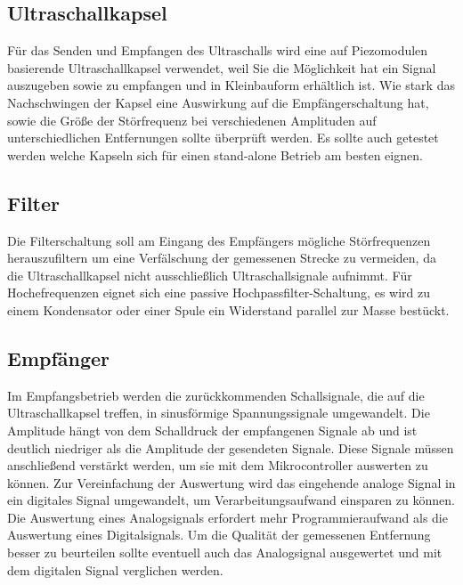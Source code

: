\subsection{Ultraschallkapsel}
Für das Senden und Empfangen des Ultraschalls wird eine auf Piezomodulen basierende Ultraschallkapsel verwendet, weil Sie die Möglichkeit hat ein Signal auszugeben sowie zu empfangen und in Kleinbauform erhältlich ist. Wie stark das Nachschwingen der Kapsel eine Auswirkung auf die Empfängerschaltung hat, sowie die Größe der Störfrequenz bei verschiedenen Amplituden auf unterschiedlichen Entfernungen sollte überprüft werden. Es sollte auch getestet werden welche Kapseln sich für einen stand-alone Betrieb am besten eignen.

\subsection{Filter}
Die Filterschaltung soll am Eingang des Empfängers mögliche Störfrequenzen herauszufiltern um eine Verfälschung der gemessenen Strecke zu vermeiden, da die Ultraschallkapsel nicht ausschließlich Ultraschallsignale aufnimmt. Für Hochefrequenzen eignet sich eine passive Hochpassfilter-Schaltung, es wird zu einem Kondensator oder einer Spule ein Widerstand parallel zur Masse bestückt. 

\subsection{Empfänger}
Im Empfangsbetrieb werden die zurückkommenden Schallsignale, die auf die Ultraschallkapsel treffen, in sinusförmige Spannungssignale umgewandelt. Die Amplitude hängt von dem Schalldruck der empfangenen Signale ab und ist deutlich niedriger als die Amplitude der gesendeten Signale. Diese Signale müssen anschließend verstärkt werden, um sie mit dem Mikrocontroller auswerten zu können. Zur Vereinfachung der Auswertung wird das eingehende analoge Signal in ein digitales Signal umgewandelt, um Verarbeitungsaufwand einsparen zu können. Die Auswertung eines Analogsignals erfordert mehr Programmieraufwand als die Auswertung eines Digitalsignals. Um die Qualität der gemessenen Entfernung besser zu beurteilen sollte eventuell auch das Analogsignal ausgewertet und mit dem digitalen Signal verglichen werden. 












